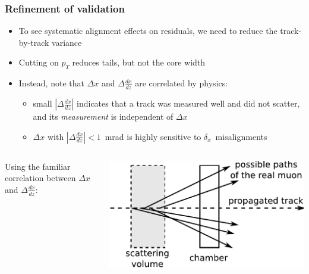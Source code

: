 \documentclass[compress]{beamer}
\begin{document}
\begin{frame}
\frametitle{Refinement of validation}

\begin{itemize}
\item To see systematic alignment effects on residuals, we need to reduce the track-by-track variance
\item Cutting on $p_T$ reduces tails, but not the core width
\item Instead, note that $\Delta x$ and $\Delta \frac{dx}{dz}$ are correlated by physics:
\begin{itemize}\setlength{\itemsep}{0.1 cm}
\item small $|\Delta \frac{dx}{dz}|$ indicates that a track was measured well and did not scatter, and its {\it measurement} is independent of $\Delta x$
\item $\Delta x$ with $|\Delta \frac{dx}{dz}| < 1$~mrad is highly sensitive to \mbox{$\delta_x$ misalignments\hspace{-1 cm}}
\end{itemize}

\end{itemize}

\begin{columns}

\vspace{-0.5 cm}
Using the familiar correlation between $\Delta x$ and $\Delta \frac{dx}{dz}$:

\vspace{0.25 cm}
\includegraphics[width=\linewidth]{sawtooth_diagram.pdf}



\end{columns}
\end{frame}
\end{document}
